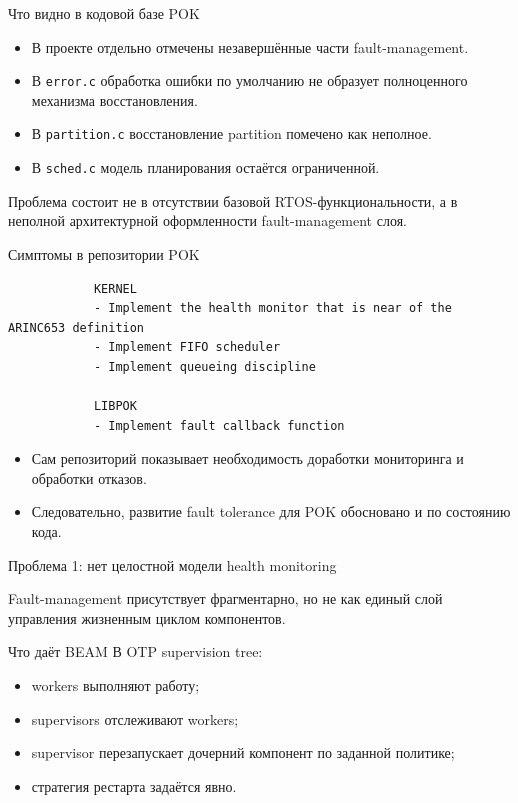 \documentclass[aspectratio=169]{beamer}
\begin{document}
	\begin{frame}{Что видно в кодовой базе POK}
		\begin{itemize}
			\item В проекте отдельно отмечены незавершённые части fault-management.
			\item В \texttt{error.c} обработка ошибки по умолчанию не образует полноценного механизма восстановления.
			\item В \texttt{partition.c} восстановление partition помечено как неполное.
			\item В \texttt{sched.c} модель планирования остаётся ограниченной.
		\end{itemize}
		
		\vspace{0.3cm}	
			Проблема состоит не в отсутствии базовой RTOS-функциональности, а в неполной архитектурной оформленности fault-management слоя.
	\end{frame}
	
	\begin{frame}[fragile]{Симптомы в репозитории POK}
		\begin{lstlisting}
			KERNEL
			- Implement the health monitor that is near of the ARINC653 definition
			- Implement FIFO scheduler
			- Implement queueing discipline
			
			LIBPOK
			- Implement fault callback function
		\end{lstlisting}
		
		\vspace{0.3cm}
		
		\begin{itemize}
			\item Сам репозиторий показывает необходимость доработки мониторинга и обработки отказов.
			\item Следовательно, развитие fault tolerance для POK обосновано и по состоянию кода.
		\end{itemize}
	\end{frame}
	
	\begin{frame}{Проблема 1: нет целостной модели health monitoring}

			Fault-management присутствует фрагментарно, но не как единый слой управления жизненным циклом компонентов.
		
		\begin{block}{Что даёт BEAM}
			В OTP supervision tree:
			\begin{itemize}
				\item workers выполняют работу;
				\item supervisors отслеживают workers;
				\item supervisor перезапускает дочерний компонент по заданной политике;
				\item стратегия рестарта задаётся явно.
			\end{itemize}
		\end{block}
	\end{frame}
	
\end{document}
